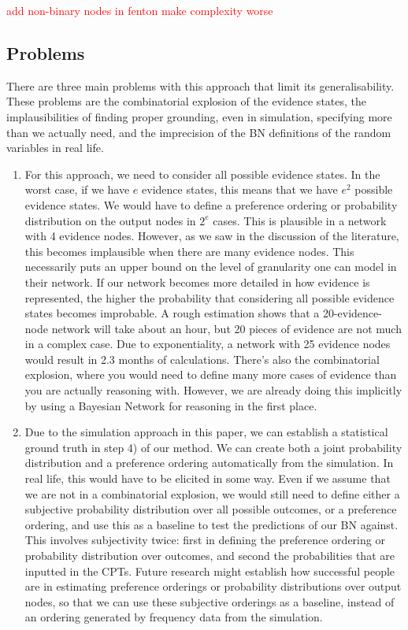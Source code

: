\documentclass[12pt]{article}
\begin{document}
 \textcolor{red} {add non-binary nodes in fenton make complexity worse}



\subsection{Problems}

There are three main problems with this approach that limit its generalisability. These problems are the combinatorial explosion of the evidence states, the implausibilities of finding proper grounding, even in simulation, specifying more than we actually need, and the imprecision of the BN definitions of the random variables in real life.

\begin{enumerate}

\item For this approach, we need to consider all possible evidence states. In the worst case, if we have $e$ evidence states, this means that we have $e^2$ possible evidence states. We would have to define a preference ordering or probability distribution on the output nodes in $2^e$ cases. This is plausible in a network with 4 evidence nodes. However, as we saw in the discussion of the literature, this becomes implausible when there are many evidence nodes. 
This necessarily puts an upper bound on the level of granularity one can model in their network. If our network becomes more detailed in how evidence is represented, the higher the probability that considering all possible evidence states becomes improbable. A rough estimation shows that a 20-evidence-node network will take about an hour, but 20 pieces of evidence are not much in a complex case. Due to exponentiality, a network with 25 evidence nodes would result in 2.3 months of calculations.
There's also the combinatorial explosion, where you would need to define many more cases of evidence than you are actually reasoning with. However, we are already doing this implicitly by using a Bayesian Network for reasoning in the first place. 

\item Due to the simulation approach in this paper, we can establish a statistical ground truth in step 4) of our method. We can create both a joint probability distribution and a preference ordering automatically from the simulation. In real life, this would have to be elicited in some way. Even if we assume that we are not in a combinatorial explosion, we would still need to define either a subjective probability distribution over all possible outcomes, or a preference ordering, and use this as a baseline to test the predictions of our BN against. This involves subjectivity twice: first in defining the preference ordering or probability distribution over outcomes, and second the probabilities that are inputted in the CPTs. Future research might establish how successful people are in estimating preference orderings or probability distributions over output nodes, so that we can use these subjective orderings as a baseline, instead of an ordering generated by frequency data from the simulation. 


\end{enumerate}
\end{document}
